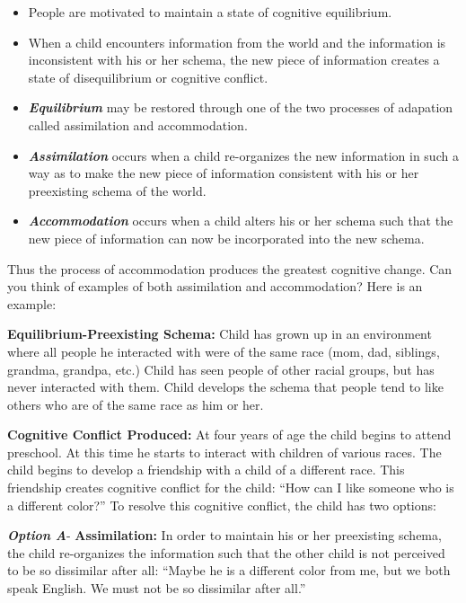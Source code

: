 \documentclass[
]{book}
\providecommand{\tightlist}{%
  \setlength{\itemsep}{0pt}\setlength{\parskip}{0pt}}
\begin{document}
\begin{itemize}
\tightlist
\item
  People are motivated to maintain a state of cognitive equilibrium.\\
\item
  When a child encounters information from the world and the information is inconsistent with his or her schema, the new piece of information creates a state of disequilibrium or cognitive conflict.\\
\item
  \textbf{\emph{Equilibrium}} may be restored through one of the two processes of adapation called assimilation and accommodation.\\
\item
  \textbf{\emph{Assimilation}} occurs when a child re-organizes the new information in such a way as to make the new piece of information consistent with his or her preexisting schema of the world.\\
\item
  \textbf{\emph{Accommodation}} occurs when a child alters his or her schema such that the new piece of information can now be incorporated into the new schema.
\end{itemize}

Thus the process of accommodation produces the greatest cognitive change. Can you think of examples of both assimilation and accommodation? Here is an example:

\textbf{Equilibrium-Preexisting Schema:} Child has grown up in an environment where all people he interacted with were of the same race (mom, dad, siblings, grandma, grandpa, etc.) Child has seen people of other racial groups, but has never interacted with them. Child develops the schema that people tend to like others who are of the same race as him or her.

\textbf{Cognitive Conflict Produced:} At four years of age the child begins to attend preschool. At this time he starts to interact with children of various races. The child begins to develop a friendship with a child of a different race. This friendship creates cognitive conflict for the child: ``How can I like someone who is a different color?'' To resolve this cognitive conflict, the child has two options:

\textbf{\emph{Option A}}- \textbf{Assimilation:} In order to maintain his or her preexisting schema, the child re-organizes the information such that the other child is not perceived to be so dissimilar after all: ``Maybe he is a different color from me, but we both speak English. We must not be so dissimilar after all.''
\end{document}
